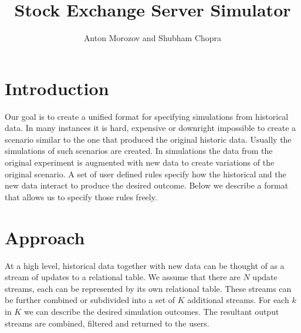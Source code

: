 \documentclass{article}
\begin{document}
    
\title{Stock Exchange Server Simulator}
\author{Anton Morozov and Shubham Chopra}
\maketitle
    
\section{Introduction}

Our goal is to create a unified format for specifying simulations from historical data. In many instances it is hard, expensive or downright impossible to create a scenario similar to the one that produced the original historic data. Usually the simulations of such scenarios are created. In simulations the data from the original experiment is augmented with new data to create variations of the original scenario. A set of user defined rules specify how the historical and the new data interact to produce the desired outcome. Below we describe a format that allows us to specify those rules freely. 


\section{Approach}

At a high level, historical data together with new data can be thought of as a stream of updates to a relational table. We assume that there are $N$ update streams, each can be represented by its own relational table. These streams can be further combined or subdivided into a set of $K$ additional streams. For each $k$ in $K$ we can describe the desired simulation outcomes. The resultant output streams are combined, filtered and returned to the users.


\end{document}
